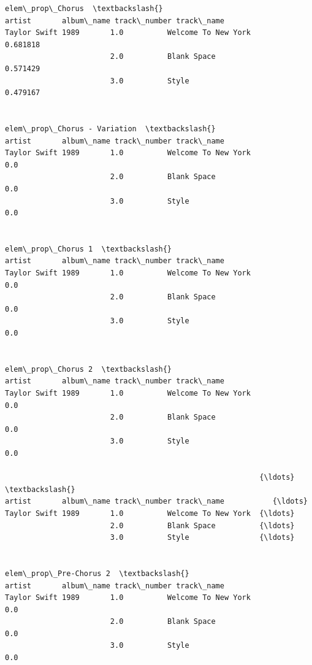 \documentclass[11pt]{article}
\begin{document}
\begin{Verbatim}[commandchars=\\\{\}]
                                                          elem\_prop\_Chorus  \textbackslash{}
artist       album\_name track\_number track\_name                              
Taylor Swift 1989       1.0          Welcome To New York          0.681818   
                        2.0          Blank Space                  0.571429   
                        3.0          Style                        0.479167   

                                                          elem\_prop\_Chorus - Variation  \textbackslash{}
artist       album\_name track\_number track\_name                                          
Taylor Swift 1989       1.0          Welcome To New York                           0.0   
                        2.0          Blank Space                                   0.0   
                        3.0          Style                                         0.0   

                                                          elem\_prop\_Chorus 1  \textbackslash{}
artist       album\_name track\_number track\_name                                
Taylor Swift 1989       1.0          Welcome To New York                 0.0   
                        2.0          Blank Space                         0.0   
                        3.0          Style                               0.0   

                                                          elem\_prop\_Chorus 2  \textbackslash{}
artist       album\_name track\_number track\_name                                
Taylor Swift 1989       1.0          Welcome To New York                 0.0   
                        2.0          Blank Space                         0.0   
                        3.0          Style                               0.0   

                                                          {\ldots}  \textbackslash{}
artist       album\_name track\_number track\_name           {\ldots}   
Taylor Swift 1989       1.0          Welcome To New York  {\ldots}   
                        2.0          Blank Space          {\ldots}   
                        3.0          Style                {\ldots}   

                                                          elem\_prop\_Pre-Chorus 2  \textbackslash{}
artist       album\_name track\_number track\_name                                    
Taylor Swift 1989       1.0          Welcome To New York                     0.0   
                        2.0          Blank Space                             0.0   
                        3.0          Style                                   0.0   


\end{Verbatim}
\end{document}
